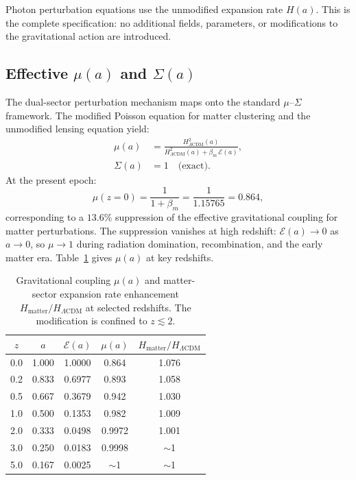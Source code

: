 \documentclass[11pt]{article}
\begin{document}
Photon perturbation equations use the unmodified expansion rate
$H(a)$.  This is the complete specification: no additional fields,
parameters, or modifications to the gravitational action are introduced.

\subsection{Effective $\mu(a)$ and $\Sigma(a)$}

The dual-sector perturbation mechanism maps onto the standard
$\mu$--$\Sigma$ framework.  The modified Poisson equation for matter
clustering and the unmodified lensing equation yield:
\begin{align}
\mu(a) &= \frac{H^2_{\Lambda\mathrm{CDM}}(a)}
  {H^2_{\Lambda\mathrm{CDM}}(a) + \beta_m\,\mathcal{E}(a)},
  \label{eq:mu}\\
\Sigma(a) &= 1 \quad \text{(exact)}.
  \label{eq:sigma}
\end{align}
At the present epoch:
\begin{equation}
\mu(z{=}0) = \frac{1}{1 + \beta_m} = \frac{1}{1.15765} = 0.864,
\end{equation}
corresponding to a $13.6\%$ suppression of the effective gravitational
coupling for matter perturbations.  The suppression vanishes at high
redshift: $\mathcal{E}(a) \to 0$ as $a \to 0$, so $\mu \to 1$
during radiation domination, recombination, and the early matter era.
Table~\ref{tab:mu_values} gives $\mu(a)$ at key redshifts.

\begin{table}[h]
\centering
\caption{Gravitational coupling $\mu(a)$ and matter-sector expansion
rate enhancement $H_\mathrm{matter}/H_{\Lambda\mathrm{CDM}}$ at
selected redshifts.  The modification is confined to $z \lesssim 2$.}
\begin{tabular}{ccccc}
\toprule
$z$ & $a$ & $\mathcal{E}(a)$ & $\mu(a)$
  & $H_\mathrm{matter}/H_{\Lambda\mathrm{CDM}}$ \\
\midrule
0.0 & 1.000 & 1.0000 & 0.864 & 1.076 \\
0.2 & 0.833 & 0.6977 & 0.893 & 1.058 \\
0.5 & 0.667 & 0.3679 & 0.942 & 1.030 \\
1.0 & 0.500 & 0.1353 & 0.982 & 1.009 \\
2.0 & 0.333 & 0.0498 & 0.9972 & 1.001 \\
3.0 & 0.250 & 0.0183 & 0.9998 & $\sim$1 \\
5.0 & 0.167 & 0.0025 & $\sim$1 & $\sim$1 \\
\bottomrule
\end{tabular}
\label{tab:mu_values}
\end{table}
\end{document}
